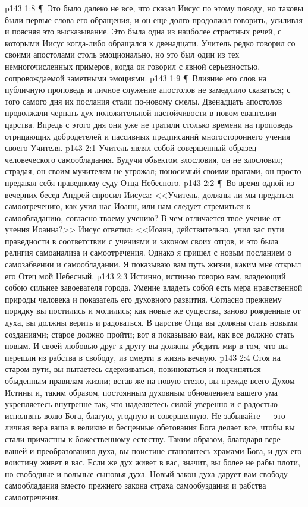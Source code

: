 \vs p143 1:8 \P\ Это было далеко не все, что сказал Иисус по этому поводу, но таковы были первые слова его обращения, и он еще долго продолжал говорить, усиливая и поясняя это высказывание. Это была одна из наиболее страстных речей, с которыми Иисус когда\hyp{}либо обращался к двенадцати. Учитель редко говорил со своими апостолами столь эмоционально, но это был один из тех немногочисленных примеров, когда он говорил с явной серьезностью, сопровождаемой заметными эмоциями.
\vs p143 1:9 \P\ Влияние его слов на публичную проповедь и личное служение апостолов не замедлило сказаться; с того самого дня их послания стали по\hyp{}новому смелы. Двенадцать апостолов продолжали черпать дух положительной настойчивости в новом евангелии царства. Впредь с этого дня они уже не тратили столько времени на проповедь отрицающих добродетелей и пассивных предписаний многостороннего учения своего Учителя.
\vs p143 2:1 Учитель являл собой совершенный образец человеческого самообладания. Будучи объектом злословия, он не злословил; страдая, он своим мучителям не угрожал; поносимый своими врагами, он просто предавал себя праведному суду Отца Небесного.
\vs p143 2:2 \P\ Во время одной из вечерних бесед Андрей спросил Иисуса: <<Учитель, должны ли мы предаться самоотречению, как учил нас Иоанн, или нам следует стремиться к самообладанию, согласно твоему учению? В чем отличается твое учение от учения Иоанна?>> Иисус ответил: <<Иоанн, действительно, учил вас пути праведности в соответствии с учениями и законом своих отцов, и это была религия самоанализа и самоотречения. Однако я пришел с новым посланием о самозабвении и самообладании. Я показываю вам путь жизни, каким мне открыл его Отец мой Небесный.
\vs p143 2:3 Истинно, истинно говорю вам, владеющий собою сильнее завоевателя города. Умение владеть собой есть мера нравственной природы человека и показатель его духовного развития. Согласно прежнему порядку вы постились и молились; как новые же существа, заново рожденные от духа, вы должны верить и радоваться. В царстве Отца вы должны стать новыми созданиями; старое должно пройти; вот я показываю вам, как все должно стать новым. И своей любовью друг к другу вы должны убедить мир в том, что вы перешли из рабства в свободу, из смерти в жизнь вечную.
\vs p143 2:4 Стоя на старом пути, вы пытаетесь сдерживаться, повиноваться и подчиняться обыденным правилам жизни; встав же на новую стезю, вы прежде всего  Духом Истины и, таким образом, постоянным духовным обновлением вашего ума укрепляетесь внутренне так, что наделяетесь силой уверенно и с радостью исполнять волю Бога, благую, угодную и совершенную. Не забывайте --- это личная вера ваша в великие и бесценные обетования Бога делает все, чтобы вы стали причастны к божественному естеству. Таким образом, благодаря вере вашей и преобразованию духа, вы поистине становитесь храмами Бога, и дух его воистину живет в вас. Если же дух живет в вас, значит, вы более не рабы плоти, но свободные и вольные сыновья духа. Новый закон духа дарует вам свободу самообладания вместо прежнего закона страха самообуздания и рабства самоотречения.
